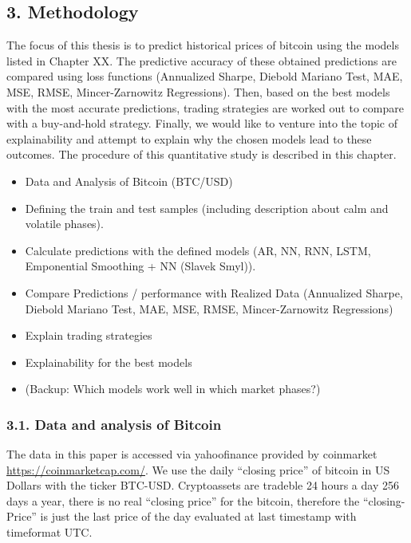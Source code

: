 \documentclass[
]{article}
\author{}
\date{\vspace{-2.5em}}
\providecommand{\tightlist}{%
  \setlength{\itemsep}{0pt}\setlength{\parskip}{0pt}}
\begin{document}
\hypertarget{methodology}{%
\subsection{3. Methodology}\label{methodology}}

The focus of this thesis is to predict historical prices of bitcoin
using the models listed in Chapter XX. The predictive accuracy of these
obtained predictions are compared using loss functions (Annualized
Sharpe, Diebold Mariano Test, MAE, MSE, RMSE, Mincer-Zarnowitz
Regressions). Then, based on the best models with the most accurate
predictions, trading strategies are worked out to compare with a
buy-and-hold strategy. Finally, we would like to venture into the topic
of explainability and attempt to explain why the chosen models lead to
these outcomes. The procedure of this quantitative study is described in
this chapter.

\begin{itemize}
\tightlist
\item
  Data and Analysis of Bitcoin (BTC/USD)
\item
  Defining the train and test samples (including description about calm
  and volatile phases).
\item
  Calculate predictions with the defined models (AR, NN, RNN, LSTM,
  Emponential Smoothing + NN (Slavek Smyl)).
\item
  Compare Predictions / performance with Realized Data (Annualized
  Sharpe, Diebold Mariano Test, MAE, MSE, RMSE, Mincer-Zarnowitz
  Regressions)
\item
  Explain trading strategies
\item
  Explainability for the best models
\item
  (Backup: Which models work well in which market phases?)
\end{itemize}

\hypertarget{data-and-analysis-of-bitcoin}{%
\subsubsection{3.1. Data and analysis of
Bitcoin}\label{data-and-analysis-of-bitcoin}}

The data in this paper is accessed via yahoofinance provided by
coinmarket \url{https://coinmarketcap.com/}. We use the daily ``closing
price'' of bitcoin in US Dollars with the ticker BTC-USD. Cryptoassets
are tradeble 24 hours a day 256 days a year, there is no real ``closing
price'' for the bitcoin, therefore the ``closing-Price'' is just the
last price of the day evaluated at last timestamp with timeformat UTC.
\end{document}
